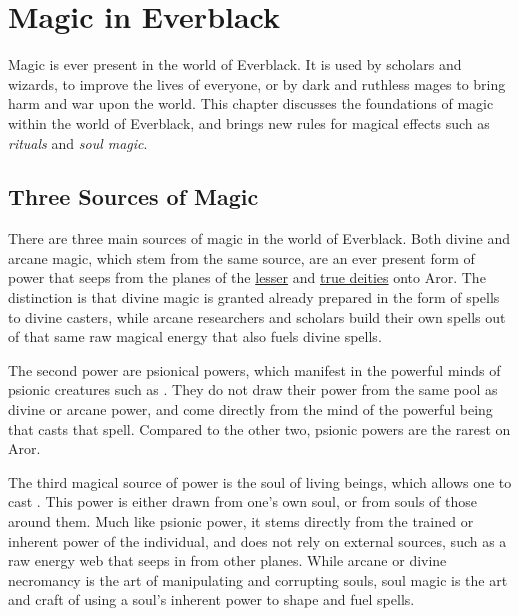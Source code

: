 \chapter{Magic in Everblack}
\label{sec:Magic}

Magic is ever present in the world of Everblack. It is used by scholars and
wizards, to improve the lives of everyone, or by dark and ruthless mages to
bring harm and war upon the world. This chapter discusses the foundations of
magic within the world of Everblack, and brings new rules for magical effects
such as \emph{rituals} and \emph{soul magic}.

\section{Three Sources of Magic}

There are three main sources of magic in the world of Everblack. Both divine
and arcane magic, which stem from the same source, are an ever present form of
power that seeps from the planes of the \hyperref[sec:Lesser Deities]{lesser}
and \hyperref[sec:True Deities]{true deities} onto Aror. The distinction is
that divine magic is granted already prepared in the form of spells to divine
casters, while arcane researchers and scholars build their own spells out of
that same raw magical energy that also fuels divine spells.

The second power are psionical powers, which manifest in the powerful minds of
psionic creatures such as . They do not draw their power
from the same pool as divine or arcane power, and come directly from the mind
of the powerful being that casts that spell. Compared to the other two, psionic
powers are the rarest on Aror.

The third magical source of power is the soul of living beings, which allows
one to cast . This power is either drawn from one's
own soul, or from souls of those around them. Much like psionic power, it
stems directly from the trained or inherent power of the individual, and does
not rely on external sources, such as a raw energy web that seeps in from
other planes. While arcane or divine necromancy is the art of manipulating
and corrupting souls, soul magic is the art and craft of using a soul's
inherent power to shape and fuel spells.






